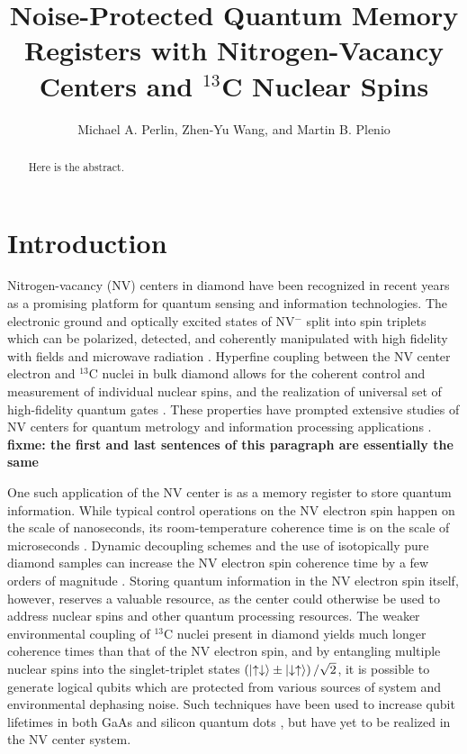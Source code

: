 \documentclass[twocolumn]{revtex4}
\newcommand{\p}[1]{\left(#1\right)} %
\renewcommand{\u}{\uparrow}
\renewcommand{\d}{\downarrow}
\newcommand{\fixme}[1]{{\bf \color{red} fixme: #1}}
\begin{document}
\title{Noise-Protected Quantum Memory Registers with Nitrogen-Vacancy
  Centers and $^{13}$C Nuclear Spins}

\author{Michael A. Perlin, Zhen-Yu Wang, and Martin B. Plenio}


\begin{abstract}
  Here is the abstract.
\end{abstract}

\maketitle

\section{Introduction}

Nitrogen-vacancy (NV) centers in diamond have been recognized in
recent years as a promising platform for quantum sensing and
information technologies. The electronic ground and optically excited
states of NV$^-$ split into spin triplets which can be polarized,
detected, and coherently manipulated with high fidelity with fields
and microwave radiation \cite{dobrovitski2013quantum}. Hyperfine
coupling between the NV center electron and $^{13}$C nuclei in bulk
diamond allows for the coherent control and measurement of individual
nuclear spins, and the realization of universal set of high-fidelity
quantum gates \cite{dobrovitski2013quantum, casanova2016noise}. These
properties have prompted extensive studies of NV centers for quantum
metrology and information processing applications
\cite{mamin2013nanoscale, steinert2010high, wang2015positioning,
  chou2015optimal, childress2006fault, yao2012scalable}. \fixme{the
  first and last sentences of this paragraph are essentially the same}

One such application of the NV center is as a memory register to store
quantum information. While typical control operations on the NV
electron spin happen on the scale of nanoseconds, its room-temperature
coherence time is on the scale of microseconds
\cite{dobrovitski2013quantum}.  Dynamic decoupling schemes and the use
of isotopically pure diamond samples can increase the NV electron spin
coherence time by a few orders of magnitude
\cite{ryan2010robust}. Storing quantum information in the NV electron
spin itself, however, reserves a valuable resource, as the center
could otherwise be used to address nuclear spins and other quantum
processing resources. The weaker environmental coupling of $^{13}$C
nuclei present in diamond yields much longer coherence times than that
of the NV electron spin, and by entangling multiple nuclear spins into
the singlet-triplet states $\p{\ket{\u\d}\pm\ket{\d\u}}/\sqrt2$, it is
possible to generate logical qubits which are protected from various
sources of system and environmental dephasing noise. Such techniques
have been used to increase qubit lifetimes in both GaAs and silicon
quantum dots \cite{bluhm2011dephasing, maune2012coherent}, but have
yet to be realized in the NV center system.
\end{document}
